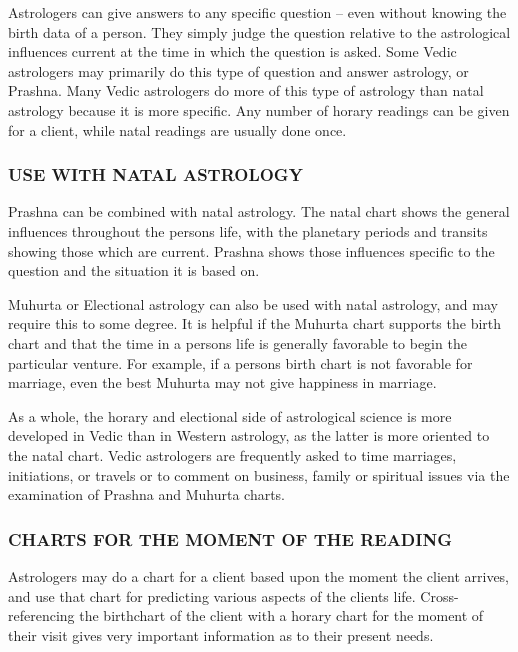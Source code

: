 

Astrologers can give answers to any specific question – even without knowing the birth data of a person. They simply judge the question relative to the astrological influences current at the time in which the question is asked. Some Vedic astrologers may primarily do this type of question and answer astrology, or Prashna. Many Vedic astrologers do more of this type of astrology than natal astrology because it is more specific. Any number of horary readings can be given for a client, while natal readings are usually done once.

\subsubsection{USE WITH NATAL ASTROLOGY}

 

Prashna can be combined with natal astrology. The natal chart shows the general influences throughout the persons life, with the planetary periods and transits showing those which are current. Prashna shows those influences specific to the question and the situation it is based on.

 

Muhurta or Electional astrology can also be used with natal astrology, and may require this to some degree. It is helpful if the Muhurta chart supports the birth chart and that the time in a persons life is generally favorable to begin the particular venture. For example, if a persons birth chart is not favorable for marriage, even the best Muhurta may not give happiness in marriage.

 

As a whole, the horary and electional side of astrological science is more developed in Vedic than in Western astrology, as the latter is more oriented to the natal chart. Vedic astrologers are frequently asked to time marriages, initiations, or travels or to comment on business, family or spiritual issues via the examination of Prashna and Muhurta charts.

 

\subsubsection{CHARTS FOR THE MOMENT OF THE READING}

 

Astrologers may do a chart for a client based upon the moment the client arrives, and use that chart for predicting various aspects of the clients life. Cross-referencing the birthchart of the client with a horary chart for the moment of their visit gives very important information as to their present needs.

